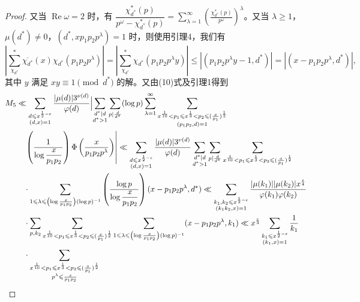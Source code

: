 \begin{proof}
又当 $\operatorname{Re}\omega=2$ 时，有 $\dfrac{\chi_{d^*}^*(p)}{p^\omega-\chi_{d^*}^*(p)}=\displaystyle\sum_{\lambda=1}^{\infty}\left(\frac{\chi_{d^*}^*(p)}{p^\omega}\right)^\lambda$。又当 $\lambda\geqslant1$，$\mu(d^*)\neq0$，$(d^*,xp_1p_2p^\lambda)=1$ 时，则使用引理4，我们有
\begin{equation}\label{eq:chen10}
\left|\sum_{\chi_{d^*}}^{*}\overline{\chi_{d^*}}(x)\chi_{d^*}(p_1p_2p^\lambda)\right|
=\left|\sum_{\chi_{d^*}}^{*}\chi_{d^*}(p_1p_2p^\lambda y)\right|
\leqslant|(p_1p_2p^\lambda y-1,d^*)|=|(x-p_1p_2p^\lambda,d^*)|,
\end{equation}
其中 $y$ 满足 $xy\equiv1\pmod{d^*}$ 的解。又由(10)式及引理1得到
\begin{align*}
M_5&\ll\sum_{\substack{d\leqslant x^{\frac12-\epsilon}\\(d,x)=1}}\frac{|\mu(d)|3^{\nu(d)}}{\varphi(d)}
\Bigl|\sum_{\substack{d^*\mid d\\d^*>1}}\sum_{p\mid\frac{d}{d^*}}(\log p)\sum_{\lambda=1}^{\infty}
\sum_{\substack{x^{\frac1{10}}<p_1\leqslant x^{\frac13}<p_2\leqslant(\frac{x}{p_1})^{\frac12}\\(p_1p_2,d)=1}}\Bigr.\\
&\quad\left.\left(\frac1{\log\dfrac{x}{p_1p_2}}\right)\Phi\left(\frac{x}{p_1p_2p^\lambda}\right)\right|
\ll\sum_{\substack{d\leqslant x^{\frac12-\epsilon}\\(d,x)=1}}\frac{|\mu(d)|3^{\nu(d)}}{\varphi(d)}
\sum_{\substack{d^*\mid d\\d^*>1}}\sum_{p\mid\frac{d}{d^*}}\sum_{\substack{x^{\frac1{10}}<p_1\leqslant x^{\frac13}<p_2\leqslant(\frac{x}{p_1})^{\frac12}}}\\
&\quad\cdot\sum_{1\leqslant\lambda\leqslant\left(\log\frac{x}{p_1p_2}\right)(\log p)^{-1}}
\left(\frac{\log p}{\log\dfrac{x}{p_1p_2}}\right)(x-p_1p_2p^\lambda,d^*)
\ll\sum_{\substack{k_1,k_2\leqslant x^{\frac12-\epsilon}\\(k_1k_2,x)=1}}\frac{|\mu(k_1)||\mu(k_2)|x^{\frac{\epsilon}{4}}}{\varphi(k_1)\varphi(k_2)}\\
&\quad\cdot\sum_{p,k_2}\sum_{\substack{x^{\frac1{10}}<p_1\leqslant x^{\frac13}<p_2\leqslant(\frac{x}{p_1})^{\frac12}}}
\sum_{1\leqslant\lambda\leqslant\left(\log\frac{x}{p_1p_2}\right)(\log p)^{-1}}(x-p_1p_2p^\lambda,k_1)
\ll x^{\frac{\epsilon}{3}}\sum_{\substack{k_1\leqslant x^{\frac12-\epsilon}\\(k_1,x)=1}}\frac1{k_1}\\
&\quad\cdot\sum_{\substack{x^{\frac1{10}}<p_1\leqslant x^{\frac13}<p_2\leqslant(\frac{x}{p_1})^{\frac12}\\p^\lambda\leqslant\frac{x}{p_1p_2}}}

\end{align*}
\end{proof}
